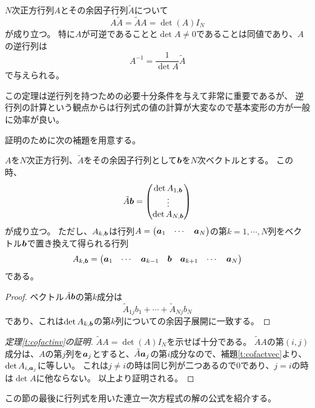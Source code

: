 \begin{theorem}[余因子行列と逆行列]
\label{t:cofactinv}
$N$次正方行列$A$とその余因子行列$\tilde{A}$について
$$
A \tilde{A} = \tilde{A} A = \det(A)I_N
$$
が成り立つ。
特に$A$が可逆であることと$\det A \ne 0$であることは同値であり、$A$の逆行列は
$$
A^{-1} = \frac{1}{\det A}\tilde{A}
$$
で与えられる。
\end{theorem}

この定理は逆行列を持つための必要十分条件を与えて非常に重要であるが、
逆行列の計算という観点からは行列式の値の計算が大変なので基本変形の方が一般に効率が良い。

証明のために次の補題を用意する。

\begin{lemma}
\label{t:cofactvec}
$A$を$N$次正方行列、$\tilde{A}$をその余因子行列として$\vb*{b}$を$N$次ベクトルとする。
この時、
$$
\tilde{A}\vb*{b}
= \begin{pmatrix}\det A_{1, \vb*{b}} \\ \vdots \\ \det A_{N, \vb*{b}}\end{pmatrix}
$$
が成り立つ。
ただし、$A_{k, \vb*{b}}$は行列$A = \begin{pmatrix}\vb*{a}_1 & \cdots & \vb*{a}_N\end{pmatrix}$の第$k = 1, \cdots, N$列をベクトル$\vb*{b}$で置き換えて得られる行列
$$
A_{k, \vb*{b}} = \begin{pmatrix}\vb*{a}_1 & \cdots & \vb*{a}_{k-1} & \vb*{b} & \vb*{a}_{k+1} & \cdots & \vb*{a}_N\end{pmatrix}
$$
である。
\end{lemma}

\begin{proof}
ベクトル$\tilde{A}\vb*{b}$の第$k$成分は
$$
\tilde{A}_{1 j}b_1+\cdots+\tilde{A}_{N j}b_N
$$
であり、これは$\det A_{k, \vb*{b}}$の第$k$列についての余因子展開に一致する。
\end{proof}

\begin{proof}[定理\ref{t:cofactinv}の証明]
$\tilde{A} A = \det(A)I_N$を示せば十分である。
$\tilde{A}A$の第$(i, j)$成分は、$A$の第$j$列を$\vb*{a}_j$とすると、$\tilde{A}\vb*{a}_j$の第$i$成分なので、補題\ref{t:cofactvec}より、$\det A_{i, \vb*{a}_j}$に等しい。
これは$j \ne i$の時は同じ列が二つあるので$0$であり、$j = i$の時は$\det A$に他ならない。
以上より証明される。
\end{proof}

この節の最後に行列式を用いた連立一次方程式の解の公式を紹介する。

